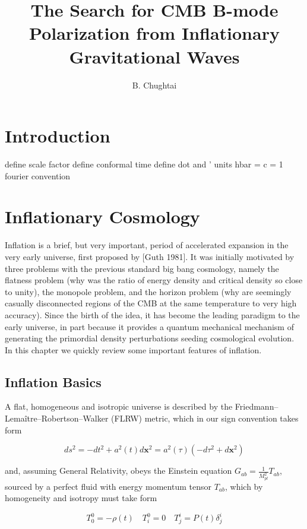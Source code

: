 \documentclass[a4paper,10pt]{article}
\title{\boldmath The Search for CMB B-mode Polarization from Inflationary Gravitational Waves}
\author{B. Chughtai}
\affiliation{University of Cambridge, Cambridge, UK}
\renewcommand{\v}[1]{\mathbf{#1}}
\newcommand{\Mp}{M_{pl}}
\begin{document}
\maketitle
\flushbottom


\section{Introduction}

define scale factor
define conformal time
define dot and '
units hbar = c = 1
fourier convention

\section{Inflationary Cosmology}
\nocite{*}
\cite{QBM}

Inflation is a brief, but very important, period of accelerated expansion in the very early universe, first proposed by [Guth 1981]. It was initially motivated by three problems with the previous standard big bang cosmology, namely the flatness problem (why was the ratio of energy density and critical density so close to unity), the monopole problem, and the horizon problem (why are seemingly casually disconnected regions of the CMB at the same temperature to very high accuracy). Since the birth of the idea, it has become the leading paradigm to the early universe, in part because it provides a quantum mechanical mechanism of generating the primordial density perturbations seeding cosmological evolution. In this chapter we quickly review some important features of inflation.

\subsection{Inflation Basics}

A flat, homogeneous and isotropic universe is described by the Friedmann–Lemaître–Robertson–Walker (FLRW) metric, which in our sign convention takes form

\begin{equation}
\label{FLRW}
ds^2 = - dt^2 + a^2(t)d\v{x}^2 = a^2(\tau)(-d\tau^2+d\v{x}^2)
\end{equation}

and, assuming General Relativity, obeys the Einstein equation $G_{ab} = \frac{1}{\Mp^2} T_{ab}$, sourced by a perfect fluid with energy momentum tensor $T_{ab}$, which by homogeneity and isotropy must take form

\begin{equation}
\label{densityandpressure}
T^0_0 = - \rho(t) \quad T^0_i = 0 \quad T^i_j = P(t)\delta^i_j
\end{equation}
\end{document}
